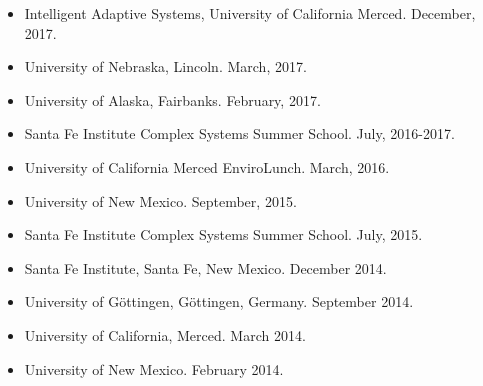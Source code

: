 \documentclass[margin,line,12pt]{res}
\begin{document}
\begin{resume}
\begin{itemize}
\item Intelligent Adaptive Systems, University of California Merced. December, 2017.

\item University of Nebraska, Lincoln. March, 2017.

\item University of Alaska, Fairbanks. February, 2017.

\item Santa Fe Institute Complex Systems Summer School. July, 2016-2017.

\item University of California Merced EnviroLunch. March, 2016.

\item University of New Mexico. September, 2015.

\item Santa Fe Institute Complex Systems Summer School. July, 2015.

\item Santa Fe Institute, Santa Fe, New Mexico. December 2014.

\item University of G\"ottingen, G\"ottingen, Germany. September 2014.

\item University of California, Merced. March 2014.

\item University of New Mexico. February 2014.


\end{itemize}
\end{resume}
\end{document}

